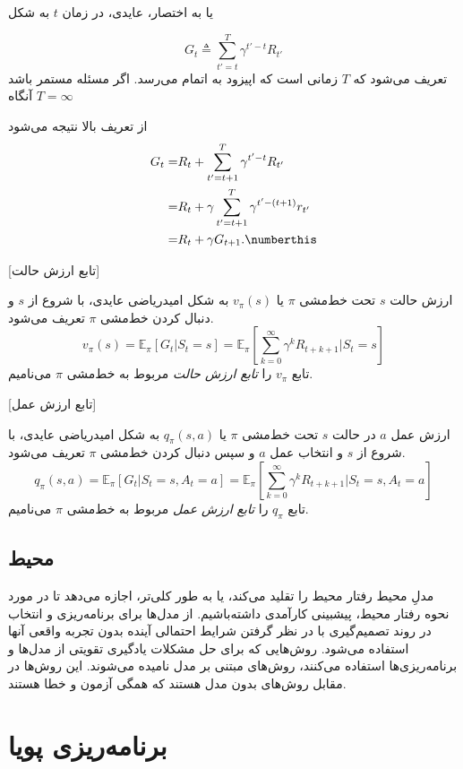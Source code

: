  یا به اختصار، عایدی، در زمان $t$ به شکل

$$G_t \triangleq \sum_{t'=t}^{T} \gamma^{t'-t} R_{t'}$$
تعریف می‌شود که $T$ زمانی است که اپیزود به اتمام می‌رسد. اگر مسئله مستمر باشد آنگاه 
$T=\infty$

از تعریف بالا نتیجه می‌شود 
\begin{align}
G_t =& R_t + \sum_{t'=t+1}^{T} \gamma^{t'-t} R_{t'} \nonumber \\
=& R_t + \gamma \sum_{t'=t+1}^{T} \gamma^{t' - (t+1)} r_{t'} \nonumber \\
=& R_t + \gamma G_{t+1}. \numberthis
\end{align}

[تابع ارزش حالت]

 ارزش حالت $s$ تحت خط‌مشی $\pi$ یا $v_\pi(s)$ به شکل امیدریاضی عایدی، با شروع از $s$ و دنبال کردن خط‌مشی $\pi$ تعریف می‌شود.
$$v_\pi(s) = \mathbb{E}_\pi\left[G_t| S_t=s\right] = \mathbb{E}_\pi\left[\sum_{k=0}^{\infty} \gamma^k R_{t+k+1}|S_t =s \right]$$
تابع $v_\pi$ را 
\textit{تابع ارزش حالت}
 مربوط به خط‌مشی 
$\pi$
می‌نامیم.

[تابع ارزش عمل]

ارزش عمل  $a$ در حالت
$s$
 تحت خط‌مشی $\pi$ یا 
 $q_\pi(s,a)$
  به شکل امیدریاضی عایدی، با شروع از $s$ و انتخاب عمل $a$  و سپس دنبال کردن خط‌مشی $\pi$ تعریف می‌شود.
$$q_\pi(s,a) = \mathbb{E}_\pi\left[G_t| S_t=s, A_t=a\right] = \mathbb{E}_\pi\left[\sum_{k=0}^{\infty} \gamma^k R_{t+k+1}|S_t =s, A_t=a \right]$$
تابع $q_\pi$ را 
\textit{تابع ارزش عمل}
 مربوط به خط‌مشی 
$\pi$
می‌نامیم.
\subsection{محیط}

مدلِ محیط رفتار محیط را تقلید می‌کند، یا به طور کلی‌تر، اجازه می‌دهد تا در مورد نحوه رفتار محیط، پیشبینی کارآمدی داشته‌باشیم. از مدل‌ها برای برنامه‌ریزی و انتخاب در روند تصمیم‌گیری  با در نظر گرفتن شرایط احتمالی آینده بدون تجربه واقعی آنها استفاده می‌شود.
روش‌هایی که برای حل مشکلات یادگیری تقویتی از مدل‌ها و برنامه‌ریزی‌ها استفاده می‌کنند، روش‌های مبتنی بر مدل نامیده می‌شوند. این روش‌ها در مقابل روش‌های بدون مدل هستند که همگی آزمون و خطا هستند.
\section{برنامه‌ریزی پویا}

